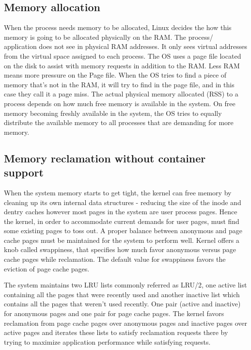     \subsection{Memory allocation}
      When the process needs memory to be allocated, Linux decides the how this memory is going to be allocated physically on the RAM. The 
process/ application does not see in physical RAM addresses. It only sees virtual addresses from the virtual space assigned to each process.
The OS uses a page file located on the disk to assist with memory requests in addition to the RAM. Less RAM means more pressure on the Page 
file. When the OS tries to find a piece of memory that's not in the RAM, it will try to find in the page file, and in this case they call it 
a page miss. The actual physical memory allocated (RSS) to a process depends on how much free memory is available in the system. On free 
memory becoming freshly available in the system, the OS tries to equally distribute the available memory to all processes that are 
demanding for more memory.

    \subsection{Memory reclamation without container support}
       When the system memory starts to get tight, the kernel can free memory by cleaning up its own internal data structures - reducing 
the size of the inode and dentry caches however most pages in the system are user process pages. Hence the kernel, in order to accommodate 
current demands for user pages, must find some existing pages to toss out. A proper balance between anonymous and page cache pages must be 
maintained for the system to perform well. Kernel offers a knob called swappiness, that specifies how much favor anonymous versus page 
cache pages while reclamation. The default value for swappiness favors the eviction of page cache pages. 
      
      The system maintains two LRU lists commonly referred as LRU/2, one active list containing all the pages that were recently used and 
another inactive list which contains all the pages that weren't used recently. One pair (active and inactive) for anonymous pages and one 
pair for page cache pages. The kernel favors reclamation from page cache pages over anonymous pages and inactive pages over active pages 
and iterates these lists to satisfy reclamation requests there by trying to maximize application performance while satisfying requests.
    
